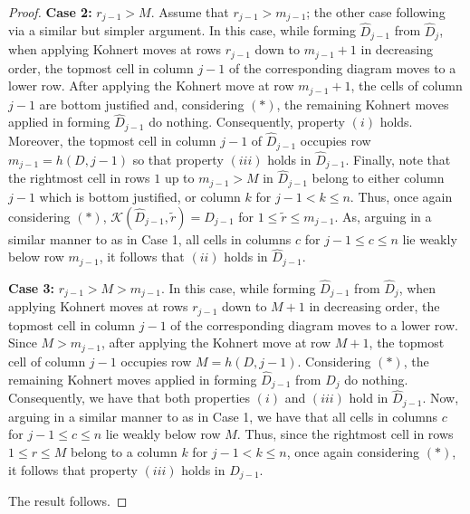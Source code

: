 \documentclass[10pt,a4paper]{amsart}
\begin{document}
\begin{proof}
    \noindent
    \textbf{Case 2:} $r_{j-1}>M$. Assume that $r_{j-1}>m_{j-1}$; the other case following via a similar but simpler argument. In this case, while forming $\widehat{D}_{j-1}$ from $\widehat{D}_{j}$, when applying Kohnert moves at rows $r_{j-1}$ down to $m_{j-1}+1$ in decreasing order, the topmost cell in column $j-1$ of the corresponding diagram moves to a lower row. After applying the Kohnert move at row $m_{j-1}+1$, the cells of column $j-1$ are bottom justified and, considering $(\ast)$, the remaining Kohnert moves applied in forming $\widehat{D}_{j-1}$ do nothing. Consequently, property $(i)$ holds. Moreover, the topmost cell in column $j-1$ of $\widehat{D}_{j-1}$ occupies row $m_{j-1}=h(D,j-1)$ so that property $(iii)$ holds in $\widehat{D}_{j-1}$. Finally, note that the rightmost cell in rows $1$ up to $m_{j-1}>M$ in $\widehat{D}_{j-1}$ belong to either column $j-1$ which is bottom justified, or column $k$ for $j-1<k\le n$. Thus, once again considering $(\ast)$, $\mathcal{K}(\widehat{D}_{j-1},\tilde{r})=\widehat{D}_{j-1}$ for $1\le \tilde{r}\le m_{j-1}$. As, arguing in a similar manner to as in Case 1, all cells in columns $c$ for $j-1\le c\le n$ lie weakly below row $m_{j-1}$, it follows that $(ii)$ holds in $\widehat{D}_{j-1}$.
    \bigskip

    \noindent
    \textbf{Case 3:} $r_{j-1}>M>m_{j-1}$. In this case, while forming $\widehat{D}_{j-1}$ from $\widehat{D}_{j}$, when applying Kohnert moves at rows $r_{j-1}$ down to $M+1$ in decreasing order, the topmost cell in column $j-1$ of the corresponding diagram moves to a lower row. Since $M>m_{j-1}$, after applying the Kohnert move at row $M+1$, the topmost cell of column $j-1$ occupies row $M=h(D,j-1)$. Considering $(\ast)$, the remaining Kohnert moves applied in forming $\widehat{D}_{j-1}$ from $\widehat{D}_{j}$ do nothing. Consequently, we have that both properties $(i)$ and $(iii)$ hold in $\widehat{D}_{j-1}$. Now, arguing in a similar manner to as in Case 1, we have that all cells in columns $c$ for $j-1\le c\le n$ lie weakly below row $M$. Thus, since the rightmost cell in rows $1\le r\le M$ belong to a column $k$ for $j-1<k\le n$, once again considering $(\ast)$, it follows that property $(iii)$ holds in $\widehat{D}_{j-1}$.
    \bigskip

    \noindent
    The result follows.
\end{proof}
\end{document}
